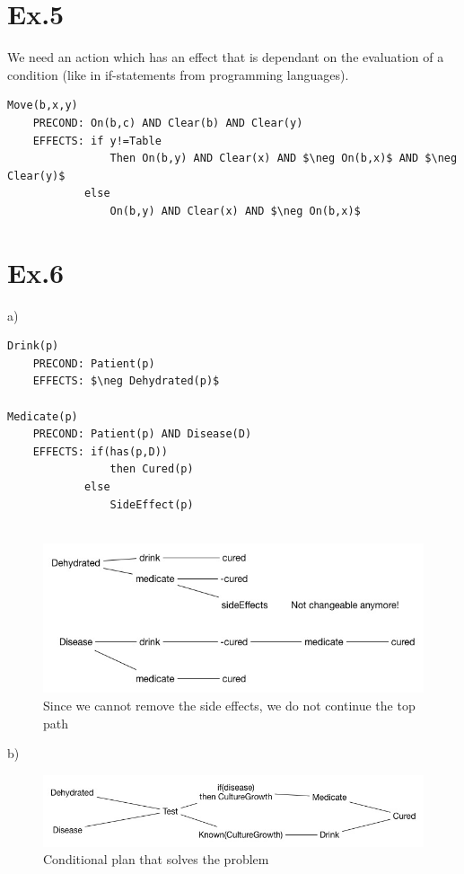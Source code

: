 \documentclass[11pt]{article}
\begin{document}
\section*{Ex.5}

We need an action which has an effect that is dependant on the evaluation of a condition (like in if-statements from programming languages).

\begin{lstlisting}[mathescape=true]
Move(b,x,y)
    PRECOND: On(b,c) AND Clear(b) AND Clear(y)
    EFFECTS: if y!=Table 
                Then On(b,y) AND Clear(x) AND $\neg On(b,x)$ AND $\neg Clear(y)$
            else
                On(b,y) AND Clear(x) AND $\neg On(b,x)$
\end{lstlisting}

\section*{Ex.6}

a)
\begin{lstlisting}[mathescape=true]
Drink(p)
    PRECOND: Patient(p)
    EFFECTS: $\neg Dehydrated(p)$
    
Medicate(p)
    PRECOND: Patient(p) AND Disease(D)
    EFFECTS: if(has(p,D)) 
                then Cured(p)
            else
                SideEffect(p)
                

\end{lstlisting}

\begin{figure}[ht]
	\centering
  \includegraphics[width=1\textwidth]{6a}
	\caption{Since we cannot remove the side effects, we do not continue the top path}
	\label{fig:6a}
\end{figure}

b)

\begin{figure}[ht]
	\centering
  \includegraphics[width=1\textwidth]{6a(2)}
	\caption{Conditional plan that solves the problem}
	\label{fig:6a(2)}
\end{figure}
\end{document}
